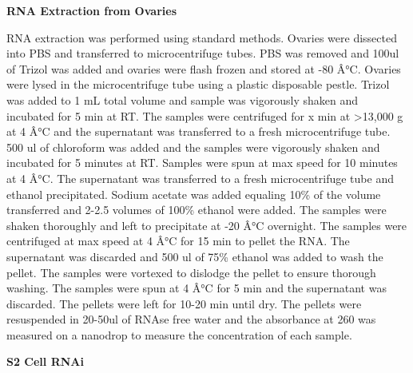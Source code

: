 \documentclass[12pt,oneside]{reedthesis}
\begin{document}
\textbf{RNA Extraction from Ovaries}

RNA extraction was performed using standard methods. Ovaries were dissected into PBS and transferred to microcentrifuge tubes. PBS was removed and 100ul of Trizol was added and ovaries were flash frozen and stored at -80 Â°C. Ovaries were lysed in the microcentrifuge tube using a plastic disposable pestle. Trizol was added to 1 mL total volume and sample was vigorously shaken and incubated for 5 min at RT. The samples were centrifuged for x min at \textgreater13,000 g at 4 Â°C and the supernatant was transferred to a fresh microcentrifuge tube. 500 ul of chloroform was added and the samples were vigorously shaken and incubated for 5 minutes at RT. Samples were spun at max speed for 10 minutes at 4 Â°C. The supernatant was transferred to a fresh microcentrifuge tube and ethanol precipitated. Sodium acetate was added equaling 10\% of the volume transferred and 2-2.5 volumes of 100\% ethanol were added. The samples were shaken thoroughly and left to precipitate at -20 Â°C overnight. The samples were centrifuged at max speed at 4 Â°C for 15 min to pellet the RNA. The supernatant was discarded and 500 ul of 75\% ethanol was added to wash the pellet. The samples were vortexed to dislodge the pellet to ensure thorough washing. The samples were spun at 4 Â°C for 5 min and the supernatant was discarded. The pellets were left for 10-20 min until dry. The pellets were resuspended in 20-50ul of RNAse free water and the absorbance at 260 was measured on a nanodrop to measure the concentration of each sample.

\textbf{S2 Cell RNAi}
\end{document}
